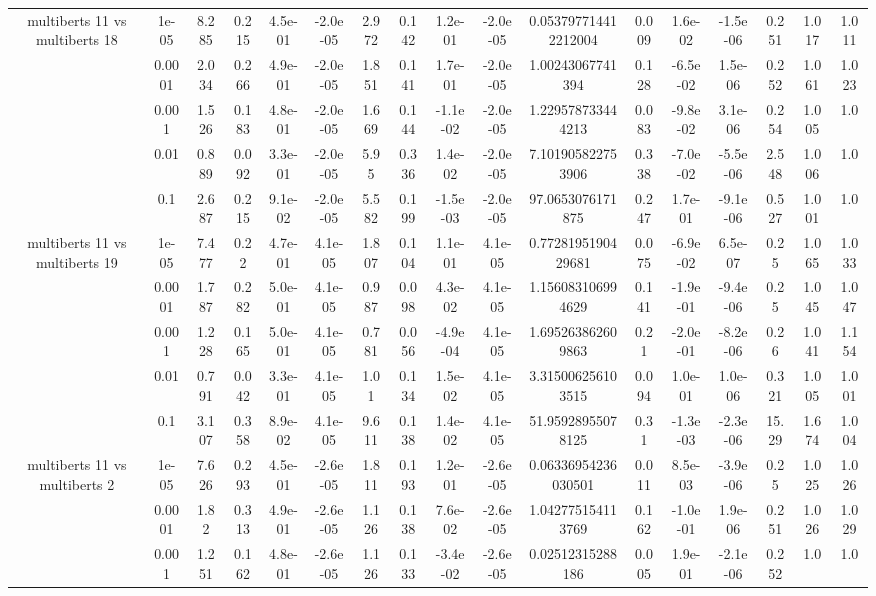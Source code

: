 \begin{tabular}{|c|c|c|c|c|c|c|c|c|c|c|c|c|c|c|c|c|}
\hline
\multirow{5}{*}{multiberts 11 vs multiberts 18} & 1e-05 & 8.285 & 0.215 & 4.5e-01 & -2.0e-05 & 2.972 & 0.142 & 1.2e-01 & -2.0e-05 & 0.053797714412212004 & 0.009 & 1.6e-02 & -1.5e-06 & 0.251 & 1.017 & 1.011 \\
 & 0.0001 & 2.034 & 0.266 & 4.9e-01 & -2.0e-05 & 1.851 & 0.141 & 1.7e-01 & -2.0e-05 & 1.00243067741394 & 0.128 & -6.5e-02 & 1.5e-06 & 0.252 & 1.061 & 1.023 \\
 & 0.001 & 1.526 & 0.183 & 4.8e-01 & -2.0e-05 & 1.669 & 0.144 & -1.1e-02 & -2.0e-05 & 1.229578733444213 & 0.083 & -9.8e-02 & 3.1e-06 & 0.254 & 1.005 & 1.0 \\
 & 0.01 & 0.889 & 0.092 & 3.3e-01 & -2.0e-05 & 5.95 & 0.336 & 1.4e-02 & -2.0e-05 & 7.101905822753906 & 0.338 & -7.0e-02 & -5.5e-06 & 2.548 & 1.006 & 1.0 \\
 & 0.1 & 2.687 & 0.215 & 9.1e-02 & -2.0e-05 & 5.582 & 0.199 & -1.5e-03 & -2.0e-05 & 97.0653076171875 & 0.247 & 1.7e-01 & -9.1e-06 & 0.527 & 1.001 & 1.0 \\
\hline
\multirow{5}{*}{multiberts 11 vs multiberts 19} & 1e-05 & 7.477 & 0.22 & 4.7e-01 & 4.1e-05 & 1.807 & 0.104 & 1.1e-01 & 4.1e-05 & 0.7728195190429681 & 0.075 & -6.9e-02 & 6.5e-07 & 0.25 & 1.065 & 1.033 \\
 & 0.0001 & 1.787 & 0.282 & 5.0e-01 & 4.1e-05 & 0.987 & 0.098 & 4.3e-02 & 4.1e-05 & 1.156083106994629 & 0.141 & -1.9e-01 & -9.4e-06 & 0.25 & 1.045 & 1.047 \\
 & 0.001 & 1.228 & 0.165 & 5.0e-01 & 4.1e-05 & 0.781 & 0.056 & -4.9e-04 & 4.1e-05 & 1.695263862609863 & 0.21 & -2.0e-01 & -8.2e-06 & 0.26 & 1.041 & 1.154 \\
 & 0.01 & 0.791 & 0.042 & 3.3e-01 & 4.1e-05 & 1.01 & 0.134 & 1.5e-02 & 4.1e-05 & 3.315006256103515 & 0.094 & 1.0e-01 & 1.0e-06 & 0.321 & 1.005 & 1.001 \\
 & 0.1 & 3.107 & 0.358 & 8.9e-02 & 4.1e-05 & 9.611 & 0.138 & 1.4e-02 & 4.1e-05 & 51.95928955078125 & 0.31 & -1.3e-03 & -2.3e-06 & 15.29 & 1.674 & 1.004 \\
\hline
\multirow{5}{*}{multiberts 11 vs multiberts 2} & 1e-05 & 7.626 & 0.293 & 4.5e-01 & -2.6e-05 & 1.811 & 0.193 & 1.2e-01 & -2.6e-05 & 0.06336954236030501 & 0.011 & 8.5e-03 & -3.9e-06 & 0.25 & 1.025 & 1.026 \\
 & 0.0001 & 1.82 & 0.313 & 4.9e-01 & -2.6e-05 & 1.126 & 0.138 & 7.6e-02 & -2.6e-05 & 1.042775154113769 & 0.162 & -1.0e-01 & 1.9e-06 & 0.251 & 1.026 & 1.029 \\
 & 0.001 & 1.251 & 0.162 & 4.8e-01 & -2.6e-05 & 1.126 & 0.133 & -3.4e-02 & -2.6e-05 & 0.02512315288186 & 0.005 & 1.9e-01 & -2.1e-06 & 0.252 & 1.0 & 1.0 \\

\end{tabular}
